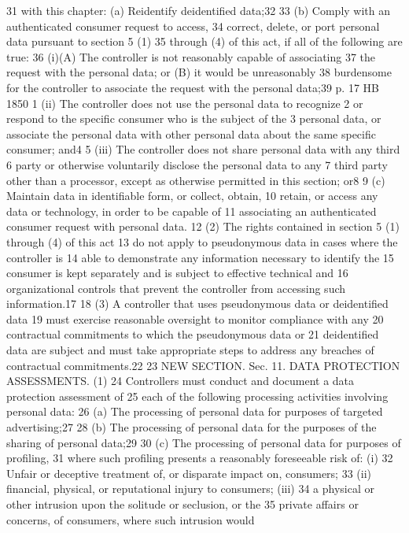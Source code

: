 31 with this chapter:
(a) Reidentify deidentified data;32
33 (b) Comply with an authenticated consumer request to access,
34 correct, delete, or port personal data pursuant to section 5 (1)
35 through (4) of this act, if all of the following are true:
36 (i)(A) The controller is not reasonably capable of associating
37 the request with the personal data; or (B) it would be unreasonably
38 burdensome for the controller to associate the request with the
personal data;39
p. 17 HB 1850
1 (ii) The controller does not use the personal data to recognize
2 or respond to the specific consumer who is the subject of the
3 personal data, or associate the personal data with other personal
data about the same specific consumer; and4
5 (iii) The controller does not share personal data with any third
6 party or otherwise voluntarily disclose the personal data to any
7 third party other than a processor, except as otherwise permitted in
this section; or8
9 (c) Maintain data in identifiable form, or collect, obtain,
10 retain, or access any data or technology, in order to be capable of
11 associating an authenticated consumer request with personal data.
12 (2) The rights contained in section 5 (1) through (4) of this act
13 do not apply to pseudonymous data in cases where the controller is
14 able to demonstrate any information necessary to identify the
15 consumer is kept separately and is subject to effective technical and
16 organizational controls that prevent the controller from accessing
such information.17
18 (3) A controller that uses pseudonymous data or deidentified data
19 must exercise reasonable oversight to monitor compliance with any
20 contractual commitments to which the pseudonymous data or
21 deidentified data are subject and must take appropriate steps to
address any breaches of contractual commitments.22
23 NEW SECTION. Sec. 11. DATA PROTECTION ASSESSMENTS. (1)
24 Controllers must conduct and document a data protection assessment of
25 each of the following processing activities involving personal data:
26 (a) The processing of personal data for purposes of targeted
advertising;27
28 (b) The processing of personal data for the purposes of the
sharing of personal data;29
30 (c) The processing of personal data for purposes of profiling,
31 where such profiling presents a reasonably foreseeable risk of: (i)
32 Unfair or deceptive treatment of, or disparate impact on, consumers;
33 (ii) financial, physical, or reputational injury to consumers; (iii)
34 a physical or other intrusion upon the solitude or seclusion, or the
35 private affairs or concerns, of consumers, where such intrusion would
